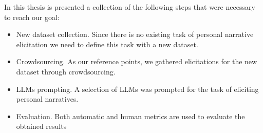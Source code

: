 In this thesis is presented a collection of the following steps that were necessary to reach our goal:
\begin{itemize}
    \item New dataset collection. Since there is no existing task of personal narrative elicitation we need to define this task with a new dataset.
    \item Crowdsourcing. As our reference points, we gathered elicitations for the new dataset through crowdsourcing.
    \item LLMs prompting. A selection of LLMs was prompted for the task of eliciting personal narratives. 
    \item Evaluation. Both automatic and human metrics are used to evaluate the obtained results
\end{itemize}




